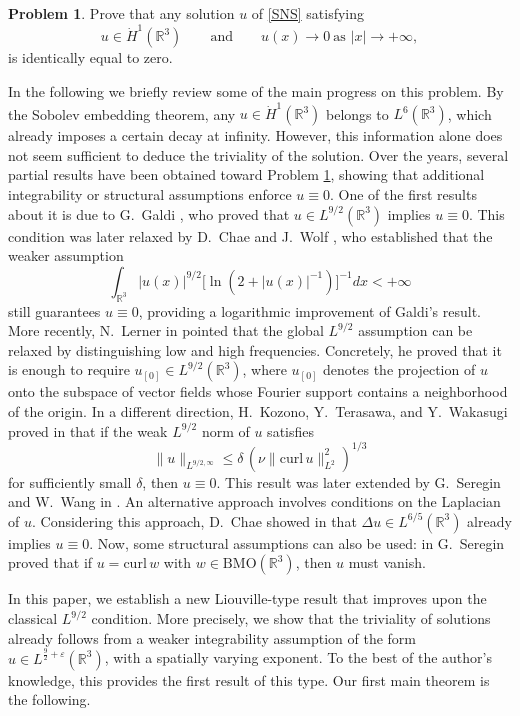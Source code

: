 \documentclass[a4paper,12pt]{amsart}
\theoremstyle{definition}
\newtheorem{problem}{Problem}[section]
\theoremstyle{plain}
\def\R{\mathbb{R}}
\def\R{\mathbb R}
\begin{document}
\begin{problem}\label{Conjecture1}
Prove that any solution $u$ of \eqref{SNS} satisfying
\begin{equation}\label{Conjecture}
u \in \dot{H}^1(\mathbb{R}^3)
\qquad \text{and} \qquad
u(x) \to 0 \ \text{as } |x| \to +\infty,
\end{equation}
is identically equal to zero.
\end{problem}

In the following we briefly review some of the main progress on this problem.  By the Sobolev embedding theorem, any $u \in \dot{H}^1(\mathbb{R}^3)$ belongs to $L^6(\mathbb{R}^3)$, which already imposes a certain decay at infinity. However, this information alone does not seem sufficient to deduce  the triviality of the solution.
Over the years, several partial results have been obtained toward Problem \ref{Conjecture1}, showing that additional integrability or structural assumptions enforce $u \equiv 0$. One of the first results  about it is due to G.~Galdi \cite{galdi2011introduction}, who proved that $u \in L^{9/2}(\mathbb{R}^3)$ implies $u \equiv 0$. This condition was later relaxed by D.~Chae and J.~Wolf \cite{ChaeWolf}, who established that the weaker assumption
\[
\int_{\mathbb{R}^3} |u(x)|^{9/2} \bigl[\ln(2 + |u(x)|^{-1})\bigr]^{-1} dx < +\infty
\]
still guarantees $u \equiv 0$, providing a logarithmic improvement of Galdi’s result.
More recently, N.~Lerner in \cite{Lerner26} pointed that the global $L^{9/2}$ assumption can be relaxed by distinguishing low and high frequencies. Concretely, he proved that it is enough to require $u_{[0]} \in L^{9/2}(\R^3)$, where $u_{[0]}$ denotes the projection of $u$ onto the subspace of vector fields whose Fourier support contains a neighborhood of the origin.
  In a different direction, H.~Kozono, Y.~Terasawa, and Y.~Wakasugi proved in \cite{Kozonoetal}  that if the weak $L^{9/2}$ norm of $u$ satisfies
\[
\|u\|_{L^{9/2,\infty}} \le \delta \, (\nu \|\mathrm{curl}\, u\|_{L^2}^2)^{1/3}
\]
for sufficiently small $\delta$, then $u \equiv 0$. This result was later extended by G.~Seregin and W.~Wang in \cite{Sereginetwang}.
An alternative approach involves conditions on the Laplacian of $u$. Considering this approach, D.~Chae  showed  in \cite{chae14} that $\Delta u \in L^{6/5}(\mathbb{R}^3)$ already implies $u \equiv 0$. Now, some structural assumptions can also be used: in \cite{Seregin16}  G.~Seregin proved that if $u = \mathrm{curl}\, w$ with $w \in \mathrm{BMO}(\mathbb{R}^3)$, then $u$ must vanish. 

In this paper, we establish a new Liouville-type result that improves upon the classical $L^{9/2}$ condition. More precisely, we show that the triviality of solutions already follows from a weaker integrability assumption of the form $u \in L^{\frac{9}{2}+\varepsilon}(\mathbb{R}^3)$, with a spatially varying exponent. To the best of the author's knowledge, this provides the first result of this type. Our first main theorem is the following.
\end{document}
